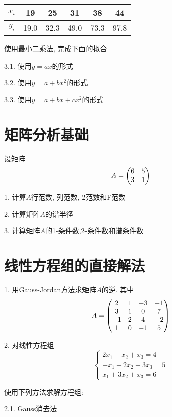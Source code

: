 \begin{table}[h!]
    \begin{tabular}{c|ccccc}
        \hline
        $x_i$&19&25&31&38&44\\
        \hline
        $y_i$&19.0&32.3&49.0&73.3&97.8\\
        \hline
    \end{tabular}
\end{table}

使用最小二乘法, 完成下面的拟合

3.1. 使用$y=ax$的形式

3.2. 使用$y=a+bx^2$的形式

3.3. 使用$y=a+bx+cx^2$的形式

\section*{矩阵分析基础}

设矩阵
\begin{equation*}
    A=\mqty(
        6&5\\
        3&1
    )
\end{equation*}

1. 计算$A$行范数, 列范数, 2范数和F范数

2. 计算矩阵$A$的谱半径

3. 计算矩阵$A$的1-条件数,2-条件数和谱条件数

\section*{线性方程组的直接解法}

1. 用Gauss-Jordan方法求矩阵$A$的逆. 其中
\begin{equation*}
    A=\mqty(2&1&-3&-1\\
    3&1&0&7\\
    -1&2&4&-2\\
    1&0&-1&5)
\end{equation*}

2. 对线性方程组
\begin{equation*}
    \begin{cases}
        2x_1-x_2+x_3=4\\
        -x_1-2x_2+3x_3=5\\
        x_1+3x_2+x_3=6
    \end{cases}
\end{equation*}

使用下列方法求解方程组:

2.1. Gauss消去法


